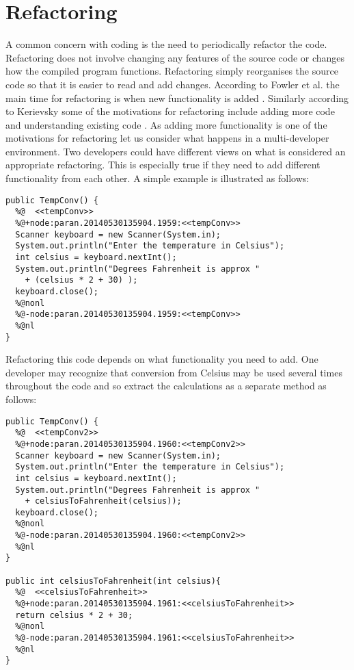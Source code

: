  

\section{Refactoring}

A common concern with coding is the need to periodically refactor the code. Refactoring does not involve changing any features of the source code or changes how the compiled program functions. Refactoring simply reorganises the source code so that it is easier to read and add changes. According to Fowler et al. the main time for refactoring is when new functionality is added \cite{Fowler1999}. Similarly according to Kerievsky some of the motivations for refactoring include adding more code and understanding existing code \cite{Kerievsky2004}. As adding more functionality is one of the motivations for refactoring let us consider what happens in a multi-developer environment. Two developers could have different views on what is considered an appropriate refactoring. This is especially true if they need to add different functionality from each other. 
A simple example is illustrated as follows:

\begin{lstlisting}
public TempConv() {
  %@  <<tempConv>>
  %@+node:paran.20140530135904.1959:<<tempConv>>
  Scanner keyboard = new Scanner(System.in);
  System.out.println("Enter the temperature in Celsius");
  int celsius = keyboard.nextInt();
  System.out.println("Degrees Fahrenheit is approx " 
    + (celsius * 2 + 30) );
  keyboard.close();
  %@nonl
  %@-node:paran.20140530135904.1959:<<tempConv>>
  %@nl
}
\end{lstlisting}

Refactoring this code depends on what functionality you need to add. One developer may recognize that conversion from Celsius may be used several times throughout the code and so extract the calculations as a separate method as follows:

\begin{lstlisting}
public TempConv() {
  %@  <<tempConv2>>
  %@+node:paran.20140530135904.1960:<<tempConv2>>
  Scanner keyboard = new Scanner(System.in);
  System.out.println("Enter the temperature in Celsius");
  int celsius = keyboard.nextInt();
  System.out.println("Degrees Fahrenheit is approx " 
    + celsiusToFahrenheit(celsius));
  keyboard.close();
  %@nonl
  %@-node:paran.20140530135904.1960:<<tempConv2>>
  %@nl
}

public int celsiusToFahrenheit(int celsius){
  %@  <<celsiusToFahrenheit>>
  %@+node:paran.20140530135904.1961:<<celsiusToFahrenheit>>
  return celsius * 2 + 30;
  %@nonl
  %@-node:paran.20140530135904.1961:<<celsiusToFahrenheit>>
  %@nl
}
\end{lstlisting}

